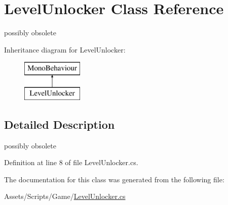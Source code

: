 \hypertarget{class_level_unlocker}{}\section{Level\+Unlocker Class Reference}
\label{class_level_unlocker}


possibly obsolete  


Inheritance diagram for Level\+Unlocker\+:\begin{figure}[H]
\begin{center}
\leavevmode
\includegraphics[height=2.000000cm]{class_level_unlocker}
\end{center}
\end{figure}


\subsection{Detailed Description}
possibly obsolete 



Definition at line 8 of file Level\+Unlocker.\+cs.



The documentation for this class was generated from the following file\+:\begin{DoxyCompactItemize}
\item 
Assets/\+Scripts/\+Game/\mbox{\hyperlink{_level_unlocker_8cs}{Level\+Unlocker.\+cs}}\end{DoxyCompactItemize}
